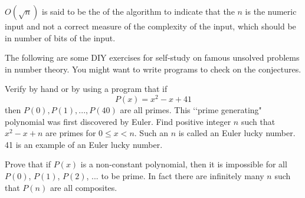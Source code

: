 $O(\sqrt{n})$ is said to be the  of the
algorithm
to indicate that the $n$ is the numeric input and not a
correct measure of the complexity of the input,
which should be in number of bits of the input.





The following are some DIY exercises for self-study on famous unsolved problems in
number theory.
You might want to write programs to check on the conjectures.














\begin{ex}
Verify by hand or by using a program that if
\[
P(x) = x^2 - x + 41
\]
then $P(0), P(1), ..., P(40)$ are all primes.
This \lq\lq prime generating" polynomial was first discovered by
Euler.
Find positive integer $n$ such that
$x^2 - x + n$ are primes for $0 \leq x < n$.
Such an $n$ is called an Euler lucky number.
41 is an example of an Euler lucky number.
\end{ex}

\begin{ex}
Prove that if $P(x)$ is a non-constant polynomial, then
it is impossible for all $P(0)$, $P(1)$, $P(2)$, ... to be prime.
In fact there are infinitely many $n$ such that $P(n)$ are all
composites.
\end{ex}
